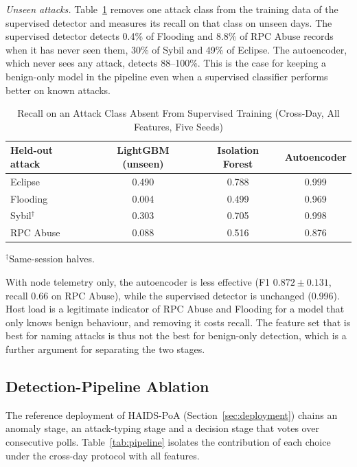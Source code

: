 \documentclass[journal]{IEEEtran}
\begin{document}
\emph{Unseen attacks.} Table~\ref{tab:zeroday} removes one attack class from the training data of the supervised detector and measures its recall on that class on unseen days. The supervised detector detects 0.4\% of Flooding and 8.8\% of RPC Abuse records when it has never seen them, 30\% of Sybil and 49\% of Eclipse. The autoencoder, which never sees any attack, detects 88--100\%. This is the case for keeping a benign-only model in the pipeline even when a supervised classifier performs better on known attacks.

\begin{table}[t]
\caption{Recall on an Attack Class Absent From Supervised Training (Cross-Day, All Features, Five Seeds)}\label{tab:zeroday}
\centering\footnotesize
\begin{tabular}{@{}lccc@{}}
\toprule
Held-out attack & LightGBM (unseen) & Isolation Forest & Autoencoder \\
\midrule
Eclipse & 0.490 & 0.788 & 0.999 \\
Flooding & 0.004 & 0.499 & 0.969 \\
Sybil$^{\dagger}$ & 0.303 & 0.705 & 0.998 \\
RPC Abuse & 0.088 & 0.516 & 0.876 \\
\bottomrule
\end{tabular}
\vspace{2pt}

{\raggedright\scriptsize $^{\dagger}$Same-session halves.\par}
\end{table}

With node telemetry only, the autoencoder is less effective (F1 $0.872 \pm 0.131$, recall 0.66 on RPC Abuse), while the supervised detector is unchanged (0.996). Host load is a legitimate indicator of RPC Abuse and Flooding for a model that only knows benign behaviour, and removing it costs recall. The feature set that is best for naming attacks is thus not the best for benign-only detection, which is a further argument for separating the two stages.

\subsection{Detection-Pipeline Ablation}\label{sec:res-pipeline}
The reference deployment of HAIDS-PoA (Section~\ref{sec:deployment}) chains an anomaly stage, an attack-typing stage and a decision stage that votes over consecutive polls. Table~\ref{tab:pipeline} isolates the contribution of each choice under the cross-day protocol with all features.
\end{document}
